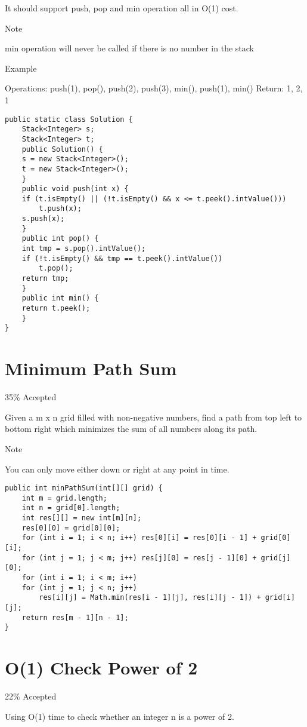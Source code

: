 \documentclass[12pt]{book}
\begin{document}
It should support push, pop and min operation all in O(1) cost.

Note

min operation will never be called if there is no number in the stack

Example

Operations: push(1), pop(), push(2), push(3), min(), push(1), min()
Return: 1, 2, 1
\lstset{language=java,label= ,caption= ,numbers=none}
\begin{lstlisting}
public static class Solution {
    Stack<Integer> s;
    Stack<Integer> t;
    public Solution() {
	s = new Stack<Integer>();
	t = new Stack<Integer>();
    }
    public void push(int x) {
	if (t.isEmpty() || (!t.isEmpty() && x <= t.peek().intValue()))
	    t.push(x);
	s.push(x);
    }
    public int pop() {
	int tmp = s.pop().intValue();
	if (!t.isEmpty() && tmp == t.peek().intValue())
	    t.pop();
	return tmp;
    }
    public int min() {
	return t.peek();
    }
}
\end{lstlisting}
\chapter{Minimum Path Sum}
\label{sec-45}

35\% Accepted

Given a m x n grid filled with non-negative numbers, find a path from top left to bottom right which minimizes the sum of all numbers along its path.

Note

You can only move either down or right at any point in time.
\lstset{language=java,label= ,caption= ,numbers=none}
\begin{lstlisting}
public int minPathSum(int[][] grid) {
    int m = grid.length;
    int n = grid[0].length;
    int res[][] = new int[m][n];
    res[0][0] = grid[0][0];
    for (int i = 1; i < n; i++) res[0][i] = res[0][i - 1] + grid[0][i];
    for (int j = 1; j < m; j++) res[j][0] = res[j - 1][0] + grid[j][0];
    for (int i = 1; i < m; i++) 
	for (int j = 1; j < n; j++) 
	    res[i][j] = Math.min(res[i - 1][j], res[i][j - 1]) + grid[i][j];
    return res[m - 1][n - 1];
}
\end{lstlisting}
\chapter{O(1) Check Power of 2}
\label{sec-46}

22\% Accepted

Using O(1) time to check whether an integer n is a power of 2.
\end{document}
